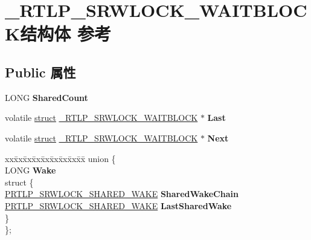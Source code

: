 \hypertarget{struct___r_t_l_p___s_r_w_l_o_c_k___w_a_i_t_b_l_o_c_k}{}\section{\+\_\+\+R\+T\+L\+P\+\_\+\+S\+R\+W\+L\+O\+C\+K\+\_\+\+W\+A\+I\+T\+B\+L\+O\+C\+K结构体 参考}
\label{struct___r_t_l_p___s_r_w_l_o_c_k___w_a_i_t_b_l_o_c_k}
\subsection*{Public 属性}
\begin{DoxyCompactItemize}
\item 
\mbox{\label{struct___r_t_l_p___s_r_w_l_o_c_k___w_a_i_t_b_l_o_c_k_a6384042b9d88f41c5f009703499b08d1}} 
L\+O\+NG {\bfseries Shared\+Count}
\item 
\mbox{\label{struct___r_t_l_p___s_r_w_l_o_c_k___w_a_i_t_b_l_o_c_k_a484bfdfbae4d382e07f70f124568abce}} 
volatile \hyperlink{interfacestruct}{struct} \hyperlink{struct___r_t_l_p___s_r_w_l_o_c_k___w_a_i_t_b_l_o_c_k}{\+\_\+\+R\+T\+L\+P\+\_\+\+S\+R\+W\+L\+O\+C\+K\+\_\+\+W\+A\+I\+T\+B\+L\+O\+CK} $\ast$ {\bfseries Last}
\item 
\mbox{\label{struct___r_t_l_p___s_r_w_l_o_c_k___w_a_i_t_b_l_o_c_k_ab6716467f888054833b720e55fa132f5}} 
volatile \hyperlink{interfacestruct}{struct} \hyperlink{struct___r_t_l_p___s_r_w_l_o_c_k___w_a_i_t_b_l_o_c_k}{\+\_\+\+R\+T\+L\+P\+\_\+\+S\+R\+W\+L\+O\+C\+K\+\_\+\+W\+A\+I\+T\+B\+L\+O\+CK} $\ast$ {\bfseries Next}
\item 
\mbox{\label{struct___r_t_l_p___s_r_w_l_o_c_k___w_a_i_t_b_l_o_c_k_ad0778886ae20c5573ac3fae020ef51cd}} 
\begin{tabbing}
xx\=xx\=xx\=xx\=xx\=xx\=xx\=xx\=xx\=\kill
union \{\\
\>LONG {\bfseries Wake}\\
\mbox{\label{union___r_t_l_p___s_r_w_l_o_c_k___w_a_i_t_b_l_o_c_k_1_1_0D458_a3a47b8c6031d954aba78a60cad516d2c}} 
\>struct \{\\
\>\>\hyperlink{struct___r_t_l_p___s_r_w_l_o_c_k___s_h_a_r_e_d___w_a_k_e}{PRTLP\_SRWLOCK\_SHARED\_WAKE} {\bfseries SharedWakeChain}\\
\>\>\hyperlink{struct___r_t_l_p___s_r_w_l_o_c_k___s_h_a_r_e_d___w_a_k_e}{PRTLP\_SRWLOCK\_SHARED\_WAKE} {\bfseries LastSharedWake}\\
\>\} \\
\}; \\


\end{tabbing}
\end{DoxyCompactItemize}
